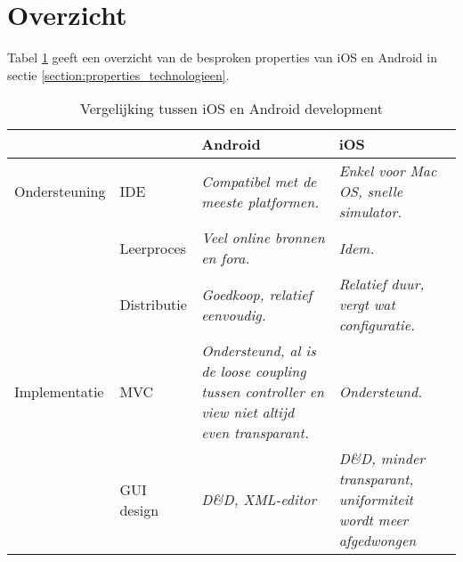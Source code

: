 \section{Overzicht}\label{section:overzicht_technologieen}

Tabel \ref{tab:comparison} geeft een overzicht van de besproken properties van iOS en Android in sectie \ref{section:properties_technologieen}.

\begin{table}[h]
\caption{Vergelijking tussen iOS en Android development}
\begin{center}
	\begin{tabular}{ l l || p{100px} p{100px} }
		\hline
									&								& \textbf{Android} 											& \textbf{iOS} \\
		\hline
		\hline
		Ondersteuning & IDE						&	\textit{Compatibel met de meeste platformen.}	& \textit{Enkel voor Mac OS, snelle simulator.} \\
									& Leerproces		&	\textit{Veel online bronnen en fora.} 				& \textit{Idem.} \\
									& Distributie		&	\textit{Goedkoop, relatief eenvoudig.} 				& \textit{Relatief duur, vergt wat configuratie.} \\
		\hline
		Implementatie & MVC						& \textit{Ondersteund, al is de loose coupling tussen controller en view niet altijd even transparant.} & \textit{Ondersteund.} \\
									& GUI design		& \textit{D\&D, XML-editor}											& \textit{D\&D, minder transparant, uniformiteit wordt meer afgedwongen} \\
		\hline
	\end{tabular}
\end{center}
\label{tab:comparison}
\end{table}



















